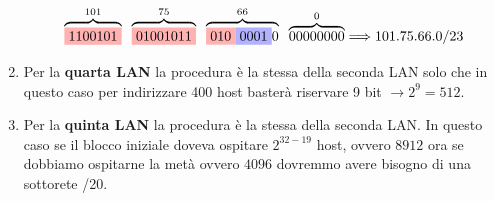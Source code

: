 \documentclass[12pt]{article}
\begin{document}
\begin{enumerate}
\[\overbrace{\colorbox{red!30!white}{1100101}}^{101} \; \; \overbrace{\colorbox{red!30!white}{01001011}}^{75} \; \; \overbrace{\colorbox{red!30!white}{010}\colorbox{blue!30!white}{0001}0}^{66} \; \; \overbrace{00000000}^{0} \Longrightarrow 101.75.66.0/23\]
\item Per la \textbf{quarta LAN} la procedura è la stessa della seconda LAN solo che in questo caso per indirizzare 400 host basterà riservare 9 bit $\rightarrow 2^9 = 512$.
\item Per la \textbf{quinta LAN} la procedura è la stessa della seconda LAN. In questo caso se il blocco iniziale doveva ospitare $2^{32-19}$ host, ovvero $8912$ ora se dobbiamo ospitarne la metà ovvero $4096$ dovremmo avere bisogno di una sottorete /20.



\end{enumerate}

\pagebreak
\end{document}
